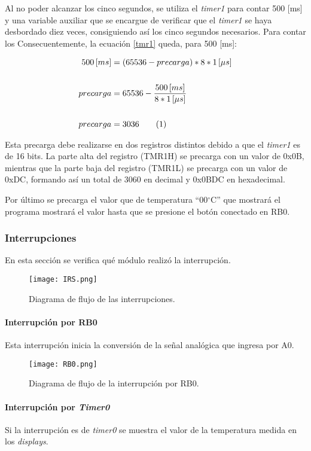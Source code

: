 \documentclass[12pt,a4paper]{article}
\newcommand\numberthis{\addtocounter{equation}{1}\tag{\theequation}}
\begin{document}
	Al no poder alcanzar los cinco segundos, se utiliza el \emph{timer1} para contar 500 [ms] y una variable auxiliar que se encargue de verificar que el \emph{timer1} se haya desbordado diez veces, consiguiendo así los cinco segundos necesarios. Para contar los 
	Consecuentemente, la ecuación \ref{tmr1} queda, para 500 [ms]:
	
	\begin{align*}
	500\,[ms] &= (65536 - precarga) * 8 * 1\,[\mu s]\\
	\\ precarga &= 65536 - \frac{500\,[ms]}{8 * 1\,[\mu s]}\\
	\\ precarga &= 3036 \numberthis
	\end{align*}
	
	Esta precarga debe realizarse en dos registros distintos debido a que el \emph{timer1} es de 16 bits. La parte alta del registro (TMR1H) se precarga con un valor de 0x0B, mientras que la parte baja del registro (TMR1L) se precarga con un valor de 0xDC, formando así un total de 3060 en decimal y 0x0BDC en hexadecimal.	
	
	Por último se precarga el valor que de temperatura ``00$^{\circ}$C'' que mostrará el programa mostrará el valor hasta que se presione el botón conectado en RB0.

	\subsubsection{Interrupciones}
	En esta sección se verifica qué módulo realizó la interrupción.
	
	\begin{figure}[H]
	\texttt{[image: IRS.png]}
	\centering
	\caption{Diagrama de flujo de las interrupciones.}
	\label{IRS}
	\end{figure}		
	
	\newpage
	\paragraph{Interrupción por RB0} Esta interrupción inicia la conversión de la señal analógica que ingresa por A0.
	
	\begin{figure}[H]
	\texttt{[image: RB0.png]}
	\centering
	\caption{Diagrama de flujo de la interrupción por RB0.}
	\label{RB0}
	\end{figure}
	
	\paragraph{Interrupción por \emph{Timer0}} Si la interrupción es de \emph{timer0} se muestra el valor de la temperatura medida en los \emph{displays}.
	
\end{document}
